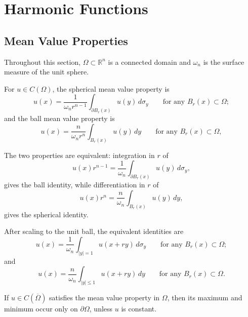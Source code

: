 \chapter{Harmonic Functions}

\section{Mean Value Properties}

Throughout this section, $\Omega\subset\mathbb{R}^n$ is a connected domain and
$\omega_n$ is the surface measure of the unit sphere.

\begin{definition}\label{hanlin:def-mean-value-properties}
For $u \in C(\Omega)$, the spherical mean value property is
\[
u(x) = \frac{1}{\omega_n r^{n-1}} \int_{\partial B_r(x)} u(y)\, d\sigma_y \qquad \text{for any } B_r(x) \subset \Omega;
\]
and the ball mean value property is
\[
u(x) = \frac{n}{\omega_n r^n} \int_{B_r(x)} u(y)\, dy \qquad \text{for any } B_r(x) \subset \Omega,
\]
\end{definition}

\begin{remark}\label{hanlin:remark-mean-value-equivalent}
The two properties are equivalent: integration in $r$ of
\[
u(x)r^{n-1} = \frac{1}{\omega_n} \int_{\partial B_r(x)} u(y)\, d\sigma_y,
\]
gives the ball identity, while differentiation in $r$ of
\[
u(x)r^n = \frac{n}{\omega_n} \int_{B_r(x)} u(y)\, dy,
\]
gives the spherical identity.
\end{remark}

\begin{remark}\label{hanlin:remark-mean-value-equivalent-forms}
After scaling to the unit ball, the equivalent identities are
\[
u(x) = \frac{1}{\omega_n} \int_{|y|=1} u(x + ry)\, d\sigma_y \qquad \text{for any } B_r(x) \subset \Omega;
\]
and
\[
u(x) = \frac{n}{\omega_n} \int_{|y| \le 1} u(x + ry)\, dy \qquad \text{for any } B_r(x) \subset \Omega.
\]
\end{remark}

\begin{theorem}\label{hanlin:thm-mean-value-max}
If $u \in C(\overline{\Omega})$ satisfies the mean value property in $\Omega$,
then its maximum and minimum occur only on $\partial\Omega$, unless $u$ is constant.
\end{theorem}


